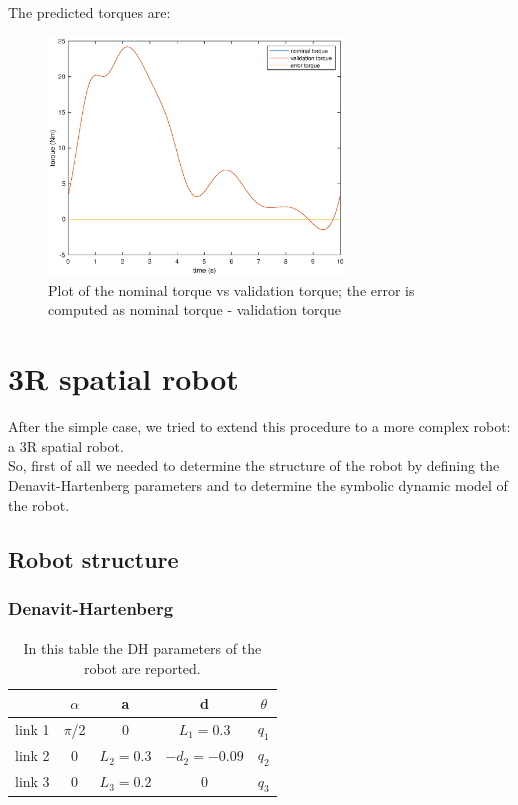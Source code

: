 \documentclass{article}
\begin{document}
The predicted torques are:

\begin{figure}[!htbp]
\centering
\includegraphics[width=0.7\textwidth]{images/1-dof/validation.eps}
\caption{Plot of the nominal torque vs validation torque; the error is computed as nominal torque - validation torque}
\end{figure}
\FloatBarrier

\pagebreak

\section{3R spatial robot}
After the simple case, we tried to extend this procedure to a more complex robot: a 3R spatial robot.\\
So, first of all we needed to determine the structure of the robot by defining the Denavit-Hartenberg parameters and to determine the symbolic dynamic model of the robot.
\subsection{Robot structure}
\subsubsection*{Denavit-Hartenberg}
\paragraph{}
\FloatBarrier
\begin{table}[!htbp]
\centering
\begin{tabular}{|c|cccc|}
\hline
& $\alpha$ & a & d & $\theta$\\
\hline
link 1 & $\pi$/2 & 0 & $L_1=0.3$ & $q_1$\\
link 2 & 0 & $L_2=0.3$ & $-d_2=-0.09$ & $q_2$\\
link 3 & 0 & $L_3=0.2$ & 0 & $q_3$\\
\hline
\end{tabular}
\caption{In this table the DH parameters of the robot are reported.}
\end{table}
\end{document}
